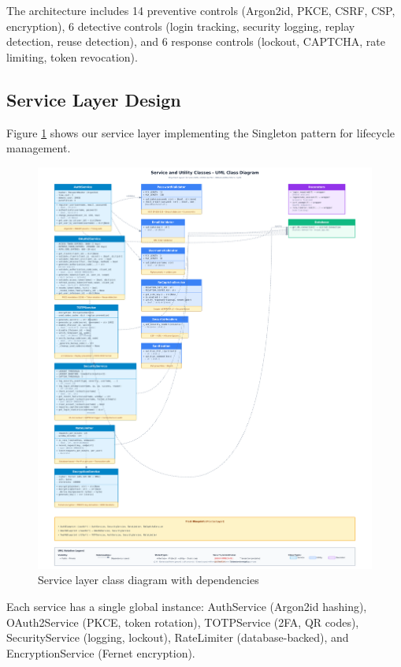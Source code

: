 \documentclass[12pt,a4paper]{article}
\begin{document}
The architecture includes 14 preventive controls (Argon2id, PKCE, CSRF, CSP, encryption), 6 detective controls (login tracking, security logging, replay detection, reuse detection), and 6 response controls (lockout, CAPTCHA, rate limiting, token revocation).

\subsection{Service Layer Design}

Figure \ref{fig:classes} shows our service layer implementing the Singleton pattern for lifecycle management.

\begin{figure}[H]
    \centering
    \includegraphics[width=\textwidth]{diagrams/2_class_diagram_services.pdf}
    \caption{Service layer class diagram with dependencies}
    \label{fig:classes}
\end{figure}

Each service has a single global instance: AuthService (Argon2id hashing), OAuth2Service (PKCE, token rotation), TOTPService (2FA, QR codes), SecurityService (logging, lockout), RateLimiter (database-backed), and EncryptionService (Fernet encryption).
\end{document}
